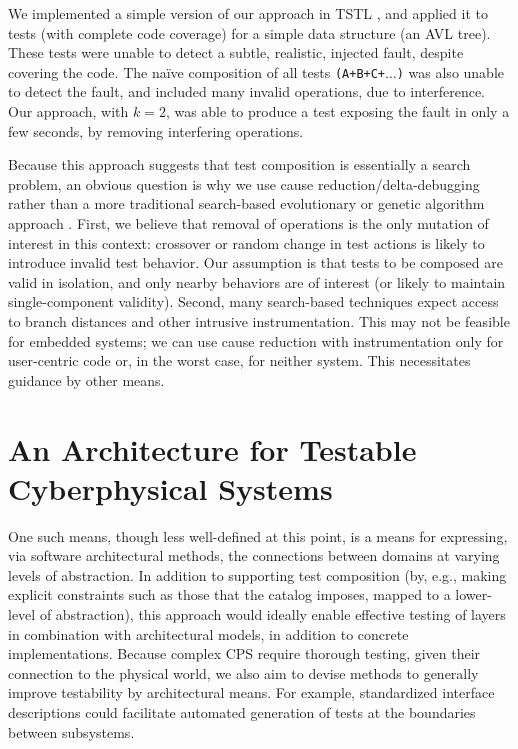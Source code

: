 We implemented a simple version of our approach in TSTL \cite{tstlsttt}, and applied
it to tests (with complete code coverage) for a simple
data structure (an AVL tree).  These tests were unable to detect a
subtle, realistic, injected fault, despite covering the code. The
na\"ive composition of all tests {\tt (A+B+C+$\ldots$)} was also unable
to detect the fault, and included many invalid operations, due to
interference.  Our approach, with $k = 2$, was able to produce a test
exposing the fault in only a few seconds, by removing interfering
operations.

Because this approach suggests that test composition is essentially a
search problem, an obvious question is why we use cause
reduction/delta-debugging rather than a more traditional search-based
evolutionary or genetic algorithm approach \cite{searchtest,McMinn04search-basedsoftware,FA11}.  First, we believe that
removal of operations is the only mutation of interest in this
context: crossover or random change in test actions is likely to
introduce invalid test behavior.  Our assumption is that tests to be
composed are valid in isolation, and only nearby behaviors are of
interest (or likely to maintain single-component validity).  Second,
many search-based techniques expect access to branch distances and
other intrusive instrumentation.  This may not be feasible for
embedded systems; we can use cause reduction with instrumentation only
for user-centric code or, in the worst case, for neither system.  This
necessitates guidance by other means.

\section{An Architecture for Testable Cyberphysical Systems}

One such means, though less well-defined at this point, is a means for expressing, via software architectural methods, the connections between domains at varying levels of abstraction.  In addition to supporting test composition (by, e.g., making explicit constraints such as those that the catalog imposes, mapped to a lower-level of abstraction), this approach would ideally enable effective testing of layers in combination with architectural models, in addition to concrete implementations.  Because complex CPS require thorough testing, given their connection to the physical world, we also aim to devise methods to generally improve testability by architectural means.  For example, standardized interface descriptions could facilitate automated generation of tests at the boundaries between subsystems.


